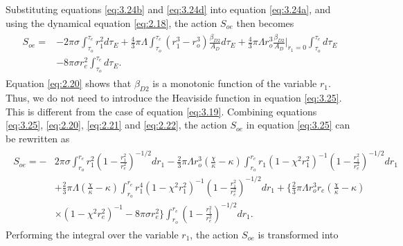 \documentclass[12pt]{article}
\begin{document}
Substituting equations \eqref{eq:3.24b} and \eqref{eq:3.24d} into equation \eqref{eq:3.24a}, and using the dynamical equation \eqref{eq:2.18}, the action $S_{oe}$ then becomes
\begin{eqnarray}\begin{split}
\label{eq:3.25}%
S_{oe}=&-2\pi\sigma\int_{\tau_{o}}^{\tau_{e}}r_{1}^{2}d\tau_{E}+\frac{4}{3}\pi\Lambda\int_{\tau_{o}}^{\tau_{e}}(r_{1}^{3}-r_{o}^{3})\frac{\beta_{D2}}{A_{D}}d\tau_{E}
+\frac{4}{3}\pi\Lambda r_{o}^{3}\frac{\beta_{D2}}{A_{D}}\Big|_{\dot{r}_{1}=0}\int_{\tau_{o}}^{\tau_{e}}d\tau_{E}\\&-8\pi\sigma r_{e}^{2}\int_{\tau_{o}}^{\tau_{e}}d\tau_{E}.
\end{split}
\end{eqnarray}
Equation \eqref{eq:2.20} shows that $\beta_{D2}$ is a monotonic function of the variable $r_{1}$. Thus, we do not need to introduce the Heaviside function in equation \eqref{eq:3.25}. This is different from the case of equation \eqref{eq:3.19}.
Combining equations  \eqref{eq:3.25}, \eqref{eq:2.20}, \eqref{eq:2.21} and \eqref{eq:2.22}, the action $S_{oe}$ in equation \eqref{eq:3.25} can be rewritten as
\begin{eqnarray}\begin{split}
\label{eq:3.25a}%
S_{oe}=-&2\pi\sigma\int_{r_{o}}^{r_{e}}r_{1}^{2}(1-\frac{r_{1}^{2}}{r_{e}^{2}})^{-1/2}dr_{1}-\frac{2}{3}\pi\Lambda r_{o}^{3}(\frac{\chi}{\kappa}-\kappa)\int_{r_{o}}^{r_{e}}r_{1}(1-\chi^{2}r_{1}^{2})^{-1}(1-\frac{r_{1}^{2}}{r_{e}^{2}})^{-1/2}dr_{1}
\\&+\frac{2}{3}\pi\Lambda(\frac{\chi}{\kappa}-\kappa)\int_{r_{o}}^{r_{e}}r_{1}^{4}(1-\chi^{2}r_{1}^{2})^{-1}(1-\frac{r_{1}^{2}}{r_{e}^{2}})^{-1/2}dr_{1}+\big\{\frac{2}{3}\pi\Lambda r_{o}^{3}r_{e}(\frac{\chi}{\kappa}-\kappa)\\&\times(1-\chi^{2}r_{e}^{2})^{-1}-8\pi\sigma r_{e}^{2}\big\}\int_{r_{o}}^{r_{e}}(1-\frac{r_{1}^{2}}{r_{e}^{2}})^{-1/2}dr_{1}.
\end{split}
\end{eqnarray}
Performing the integral over the variable $r_{1}$, the action $S_{oe}$ is transformed into
\end{document}

